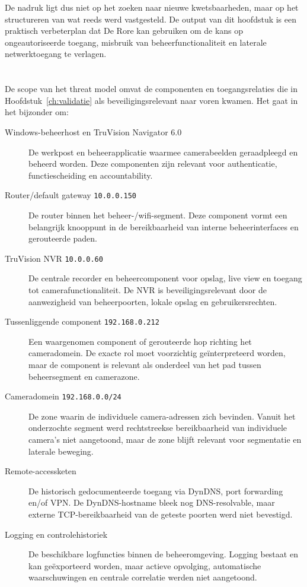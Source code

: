 De nadruk ligt dus niet op het zoeken naar nieuwe kwetsbaarheden, maar op het structureren van wat reeds werd vastgesteld. De output van dit hoofdstuk is een praktisch verbeterplan dat De Rore kan gebruiken om de kans op ongeautoriseerde toegang, misbruik van beheerfunctionaliteit en laterale netwerktoegang te verlagen.

\section{}%
\label{sec:stride-assets}

De scope van het threat model omvat de componenten en toegangsrelaties die in Hoofdstuk~\ref{ch:validatie} als beveiligingsrelevant naar voren kwamen. Het gaat in het bijzonder om:

\begin{description}
    \item[Windows-beheerhost en TruVision Navigator 6.0] De werkpost en beheerapplicatie waarmee camerabeelden geraadpleegd en beheerd worden. Deze componenten zijn relevant voor authenticatie, functiescheiding en accountability.
    \item[Router/default gateway \texttt{10.0.0.150}] De router binnen het beheer-/wifi-segment. Deze component vormt een belangrijk knooppunt in de bereikbaarheid van interne beheerinterfaces en gerouteerde paden.
    \item[TruVision NVR \texttt{10.0.0.60}] De centrale recorder en beheercomponent voor opslag, live view en toegang tot camerafunctionaliteit. De NVR is beveiligingsrelevant door de aanwezigheid van beheerpoorten, lokale opslag en gebruikersrechten.
    \item[Tussenliggende component \texttt{192.168.0.212}] Een waargenomen component of gerouteerde hop richting het cameradomein. De exacte rol moet voorzichtig geïnterpreteerd worden, maar de component is relevant als onderdeel van het pad tussen beheersegment en camerazone.
    \item[Cameradomein \texttt{192.168.0.0/24}] De zone waarin de individuele camera-adressen zich bevinden. Vanuit het onderzochte segment werd rechtstreekse bereikbaarheid van individuele camera's niet aangetoond, maar de zone blijft relevant voor segmentatie en laterale beweging.
    \item[Remote-accessketen] De historisch gedocumenteerde toegang via DynDNS, port forwarding en/of VPN. De DynDNS-hostname bleek nog DNS-resolvable, maar externe TCP-bereikbaarheid van de geteste poorten werd niet bevestigd.
    \item[Logging en controlehistoriek] De beschikbare logfuncties binnen de beheeromgeving. Logging bestaat en kan geëxporteerd worden, maar actieve opvolging, automatische waarschuwingen en centrale correlatie werden niet aangetoond.
\end{description}

